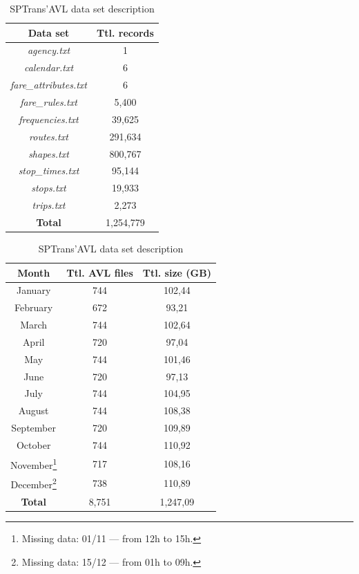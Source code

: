 \documentclass[runningheads]{llncs}
\begin{document}
\begin{table}[!htb]
    \begin{minipage}[t]{.45\linewidth}
      \caption{Data set and total records specified in SPTrans' GTFS}
      \centering
      \label {tab:gtfs}
\begin {tabular} {c | c}
\toprule
\textbf{Data set} & \textbf {Ttl. records} \\
\midrule
\textit{agency.txt} & 1 \\
\hline
\textit{calendar.txt} & 6 \\
\hline
\textit{fare\_attributes.txt} & 6 \\
\hline
\textit{fare\_rules.txt} & 5,400 \\
\hline
\textit{frequencies.txt} & 39,625 \\
\hline
\textit{routes.txt} & 291,634 \\
\hline
\textit{shapes.txt} & 800,767 \\
\hline
\textit{stop\_times.txt} & 95,144 \\
\hline
\textit{stops.txt} & 19,933 \\
\hline
\textit{trips.txt} & 2,273 \\
\midrule
\textbf{Total} & 1,254,779 \\
\bottomrule
\end {tabular}
\end{minipage}%
\quad
    \begin{minipage}[t]{.45\linewidth}
      \centering
        \caption{SPTrans'AVL data set description}
        \label{tab:avlDataset}
\begin{tabular}{ c | c | c}
\toprule
\textbf{Month} & \textbf{Ttl. AVL files} & \textbf{Ttl. size (GB)}\\
\midrule
January & 744 & 102,44 \\
\hline
 February & 672 & 93,21 \\
\hline
 March & 744 & 102,64 \\
\hline
 April & 720 & 97,04 \\
\hline
 May & 744 & 101,46 \\
\hline
 June & 720 & 97,13 \\
\hline
 July & 744 & 104,95 \\
\hline
 August &  744 & 108,38 \\
\hline
 September & 720 & 109,89 \\
\hline
 October & 744 & 110,92 \\
\hline
 November\footnote{Missing data: 01/11 --- from 12h to 15h.} & 717 & 108,16 \\
\hline
 December\footnote{Missing data: 15/12 --- from 01h to 09h.} & 738 & 110,89 \\
\midrule
\textbf{Total} & 8,751 & 1,247,09 \\
\bottomrule
\end{tabular}
    \end{minipage} 
\end{table}
\end{document}
